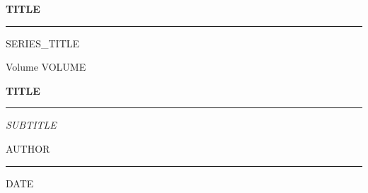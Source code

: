 \documentclass[11pt,letterpaper,openany]{book}
\numberwithin{equation}{chapter}
\numberwithin{figure}{chapter}
\numberwithin{table}{chapter}
\theoremstyle{darktheorem}
\theoremstyle{darkremark}
\begin{document}
\begin{titlepage}
    \centering
    \vspace*{4cm}
    {\Huge\bfseries\color{silver} {{TITLE}} \par}
    \vfill
\end{titlepage}

\clearpage\thispagestyle{empty}\mbox{}\clearpage

\begin{titlepage}
    \centering
    \vspace*{1.5cm}

    {\textcolor{mutedgold}{\rule{0.6\textwidth}{1pt}}}

    \vspace{0.8cm}

    {\textcolor{dimsilver}{\large\scshape {{SERIES_TITLE}}}}

    \vspace{0.3cm}

    {\textcolor{dimsilver}{\normalsize Volume {{VOLUME}}}}

    \vspace{1.5cm}

    {\Huge\bfseries\color{silver} {{TITLE}} \par}

    \vspace{0.5cm}

    {\textcolor{mutedgold}{\rule{0.4\textwidth}{0.5pt}}}

    \vspace{0.4cm}

    {\large\color{steel}\itshape {{SUBTITLE}} \par}

    \vspace{3cm}

    {\Large\color{textwhite} {{AUTHOR}} \par}

    \vfill

    {\textcolor{mutedgold}{\rule{0.6\textwidth}{1pt}}}

    \vspace{0.5cm}

    {\normalsize\color{dimsilver} {{DATE}} \par}

\end{titlepage}

\clearpage\thispagestyle{empty}\mbox{}\clearpage
\end{document}
